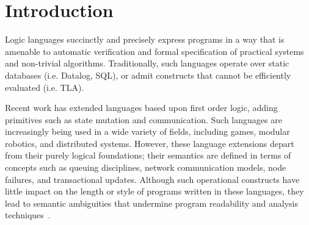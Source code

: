 \section{Introduction}

Logic languages succinctly and precisely express programs in a way
that is amenable to automatic verification and formal specification
of practical systems and
non-trivial algorithms.
Traditionally, such languages operate over static databases
(i.e. Datalog, SQL), or admit constructs that cannot be efficiently
evaluated (i.e. TLA).

Recent work has extended languages based upon first order logic,
adding primitives such as state mutation and communication.  Such
languages are increasingly being used in a wide variety of fields,
including games, modular robotics, and distributed systems.  However,
these language extensions depart from their purely logical
foundations; their semantics are defined in terms of concepts such as
queuing disciplines, network communication models, node failures, and
transactional updates.  Although such operational constructs have
little impact on the length or style of programs written in these
languages, they lead to semantic ambiguities that undermine program
readability and analysis techniques~.


